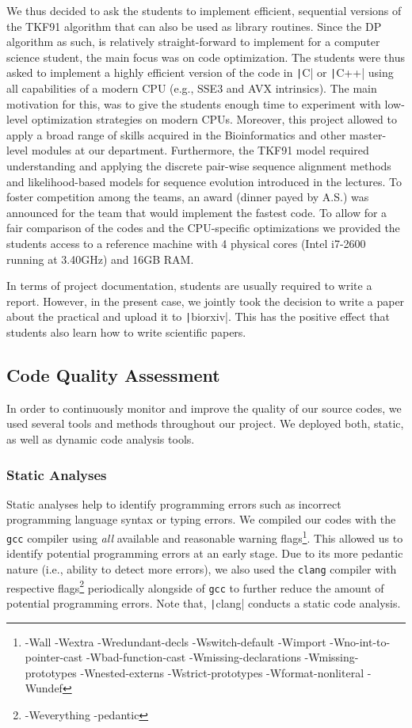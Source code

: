 \documentclass[runningheads,a4paper]{llncs}
\begin{document}
We thus decided to ask the students to implement efficient, sequential versions of the TKF91 algorithm that can also be used as library routines. 
Since the DP algorithm as such, is relatively straight-forward to implement for a computer science student, the main focus was on code optimization. 
The students were thus asked to implement a highly efficient version of the code in \texttt|C| or \texttt|C++| using all capabilities of a modern CPU (e.g., SSE3 and AVX intrinsics).
The main motivation for this, was to give the students enough time to experiment with low-level optimization strategies on modern CPUs. 
Moreover, this project allowed to apply a broad range of skills acquired in the Bioinformatics and other master-level modules at our department.
Furthermore, the TKF91 model required understanding and applying the discrete pair-wise sequence alignment methods and likelihood-based models for sequence evolution
introduced in the lectures. 
To foster competition among the teams, an award (dinner payed by A.S.) was announced for the team that would implement the fastest code. 
To allow for a fair comparison of the codes and the CPU-specific optimizations we provided the students access to a reference machine with 
4 physical cores (Intel i7-2600 running at 3.40GHz) and 16GB RAM. 

In terms of project documentation, students are usually required to write a report. However, in the present case, we jointly took the decision to write a paper 
about the practical and upload it to \texttt|biorxiv|. This has the positive effect that students also learn how to write scientific papers.

\subsection{Code Quality Assessment}
In order to continuously monitor and improve the quality of our source codes, we used several tools and methods throughout our project.
We deployed both, static, as well as dynamic code analysis tools.

\subsubsection{Static Analyses}
Static analyses help to identify programming errors such as incorrect programming language syntax or typing errors.
We compiled our codes with the \texttt{gcc} compiler using {\em all} available and reasonable warning 
flags\footnote{-Wall -Wextra -Wredundant-decls -Wswitch-default -Wimport -Wno-int-to-pointer-cast -Wbad-function-cast -Wmissing-declarations 
-Wmissing-prototypes -Wnested-externs -Wstrict-prototypes -Wformat-nonliteral -Wundef}. 
This allowed us to identify potential programming errors at an early stage. 
Due to its more pedantic nature (i.e., ability to detect more errors), we also used the \texttt{clang} compiler with respective flags\footnote{-Weverything -pedantic} 
periodically alongside of \texttt{gcc} to further reduce the amount of potential programming errors. Note that, \texttt|clang| conducts a static code analysis.
\end{document}

